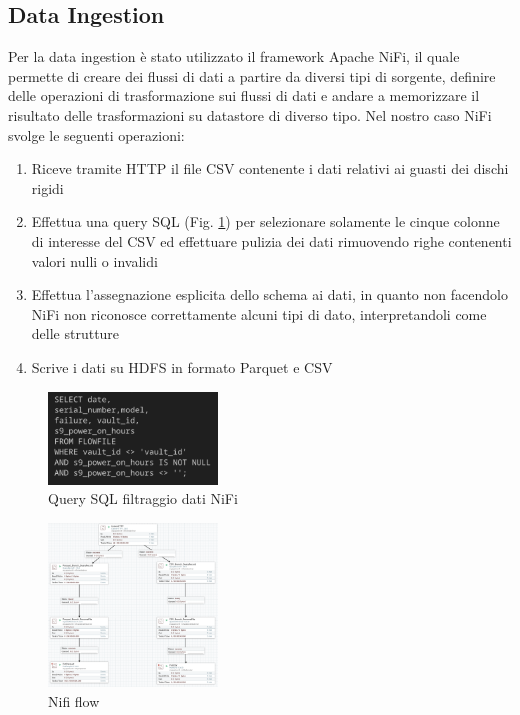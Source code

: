 \documentclass[conference]{IEEEtran}
\begin{document}
\subsection{Data Ingestion}
Per la data ingestion è stato utilizzato il framework Apache NiFi, il quale permette di creare dei flussi di dati a partire da diversi tipi di sorgente, definire delle operazioni di trasformazione sui flussi di dati e andare a memorizzare il risultato delle trasformazioni su datastore di diverso tipo. Nel nostro caso NiFi svolge le seguenti operazioni:
\begin{enumerate}
    \item Riceve tramite HTTP il file CSV contenente i dati relativi ai guasti dei dischi rigidi
    \item Effettua una query SQL (Fig. \ref{fig:nifi_query}) per selezionare solamente le cinque colonne di interesse del CSV ed effettuare pulizia dei dati rimuovendo righe contenenti valori nulli o invalidi
    \item Effettua l'assegnazione esplicita dello schema ai dati, in quanto non facendolo NiFi non riconosce correttamente alcuni tipi di dato, interpretandoli come delle strutture
    \item Scrive i dati su HDFS in formato Parquet e CSV
\end{enumerate}
\begin{figure}[H]
    \centering
    \includegraphics[width=0.4\textwidth]{./res/query_nifi.png}
    \caption{Query SQL filtraggio dati NiFi}
    \label{fig:nifi_query}
\end{figure} 
\begin{figure}[H]
    \centering
    \includegraphics[width=0.4\textwidth]{./res/nifi_flow.png}
    \caption{Nifi flow}
    \label{fig:nifi_flow}
\end{figure} 
\end{document}
